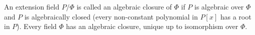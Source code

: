 An extension field $P/\Phi$ is called an algebraic closure of $\Phi$ if $P$ is algebraic over $\Phi$ and $P$ is algebraically closed (every non-constant polynomial in $P[x]$ has a root in $P$). Every field $\Phi$ has an algebraic closure, unique up to isomorphism over $\Phi$.
